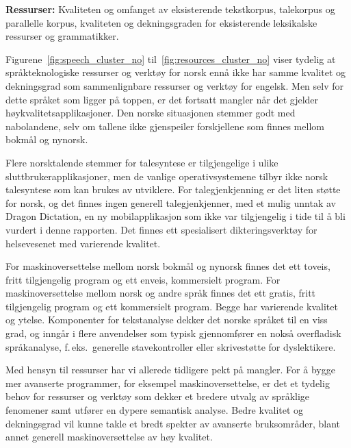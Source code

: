\begin{multicols}{2}
\textbf{Ressurser:} Kvaliteten og omfanget av eksisterende tekstkorpus, talekorpus og parallelle korpus, kvaliteten og dekningsgraden for eksisterende leksikalske ressurser og grammatikker.


Figurene~\ref{fig:speech_cluster_no} til~\ref{fig:resources_cluster_no} viser tydelig at språkteknologiske ressurser og verktøy for norsk ennå ikke har samme kvalitet og dekningsgrad som sammenlignbare ressurser og verktøy for engelsk. Men selv for dette språket som ligger på toppen, er det fortsatt mangler når det gjelder høykvalitetsapplikasjoner. 
Den norske situasjonen stemmer godt med nabolandene, selv om tallene ikke gjenspeiler forskjellene som finnes mellom bokmål og nynorsk.

Flere norsktalende stemmer for talesyntese er tilgjengelige i ulike sluttbrukerapplikasjoner, men de vanlige operativsystemene tilbyr ikke norsk talesyntese som kan brukes av utviklere. 
For talegjenkjenning er det liten støtte for norsk, og det finnes ingen generell talegjenkjenner, med et mulig unntak av Dragon Dictation, en ny mobilapplikasjon som ikke var tilgjengelig i tide til å bli vurdert i denne rapporten.
Det finnes ett spesialisert dikteringsverktøy for helsevesenet med varierende kvalitet. 

For maskinoversettelse mellom norsk bokmål og nynorsk finnes det ett toveis, fritt tilgjengelig program og ett enveis, kommersielt program. 
For maskinoversettelse mellom norsk og andre språk finnes det ett gratis, fritt tilgjengelig program og ett kommersielt program. Begge har varierende kvalitet og ytelse. Komponenter for tekstanalyse dekker det norske språket til en viss grad, og inngår i flere anvendelser som typisk gjennomfører en nokså overfladisk språkanalyse, f.\,eks.~generelle stavekontroller eller skrivestøtte for dyslektikere. 

Med hensyn til ressurser har vi allerede tidligere pekt på mangler.
For å bygge mer avanserte programmer, for eksempel maskinoversettelse, er det et tydelig behov for ressurser og verktøy som dekker et bredere utvalg av språklige fenomener samt utfører en dypere semantisk analyse. Bedre kvalitet og dekningsgrad vil kunne takle et bredt spekter av avanserte bruksområder, blant annet generell maskinoversettelse av høy kvalitet.


\end{multicols}
